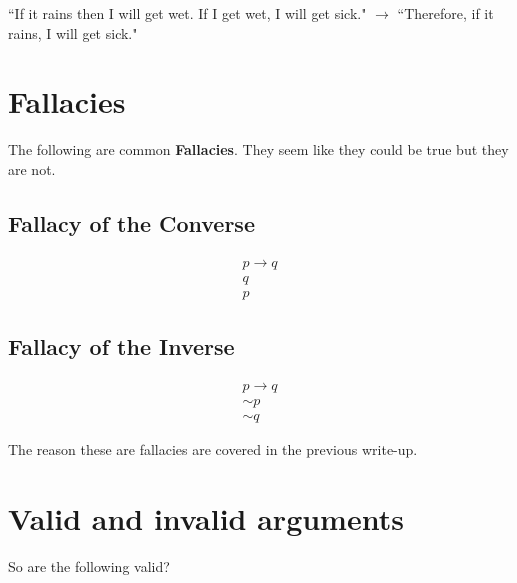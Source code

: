 ``If it rains then I will get wet.  If I get wet, I will get sick."  $\to $ ``Therefore, if it rains, I will get sick."


\section{Fallacies}\label{Fallacies}

The following are common \textbf{ Fallacies}.  They seem like they could be true but they are not.

\subsection{Fallacy of the Converse}

$$\begin{array}{l}
p\to q \\
q\\
\hline
p
\end{array}$$



\subsection{Fallacy of the Inverse}

$$\begin{array}{l}
p\to q \\
\sim p\\
\hline
\sim q
\end{array}$$

The reason these are fallacies are covered in the previous write-up.


\section{Valid and invalid arguments}\label{Section:ValidArguments}

So are the following valid?

